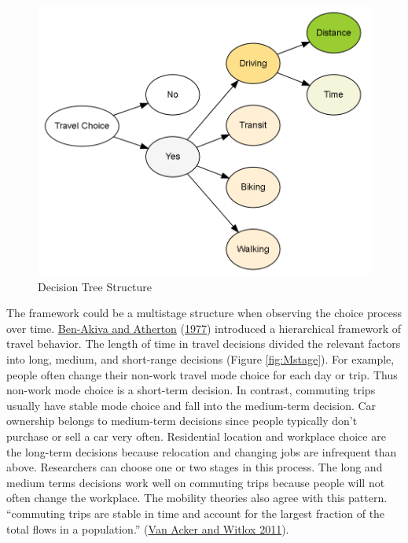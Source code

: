\documentclass[
  12pt,
]{article}
\begin{document}
\begin{figure}

{\centering \includegraphics[width=0.5\linewidth]{fig/tree} 

}

\caption{Decision Tree Structure}\label{fig:Tree}
\end{figure}

The framework could be a multistage structure when observing the choice process over time. \protect\hyperlink{ref-ben-akivaMethodologyShortRangeTravel1977a}{Ben-Akiva and Atherton} (\protect\hyperlink{ref-ben-akivaMethodologyShortRangeTravel1977a}{1977}) introduced a hierarchical framework of travel behavior. The length of time in travel decisions divided the relevant factors into long, medium, and short-range decisions (Figure \ref{fig:Mstage}). For example, people often change their non-work travel mode choice for each day or trip. Thus non-work mode choice is a short-term decision. In contrast, commuting trips usually have stable mode choice and fall into the medium-term decision. Car ownership belongs to medium-term decisions since people typically don't purchase or sell a car very often. Residential location and workplace choice are the long-term decisions because relocation and changing jobs are infrequent than above. Researchers can choose one or two stages in this process. The long and medium terms decisions work well on commuting trips because people will not often change the workplace. The mobility theories also agree with this pattern. ``commuting trips are stable in time and account for the largest fraction of the total flows in a population.'' (\protect\hyperlink{ref-vanackerCommutingTripsTours2011}{Van Acker and Witlox 2011}).
\end{document}

